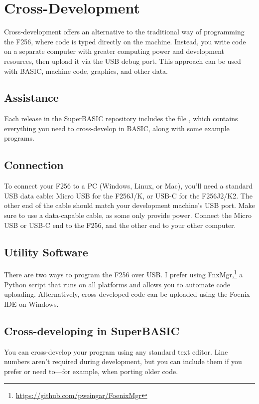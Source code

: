 \chapter{Cross-Development}
\label{chap:crossdev}

Cross-development offers an alternative to the traditional way of programming the F256, where code is typed directly on the machine. Instead, you write code on a separate computer with greater computing power and development resources, then upload it via the USB debug port. This approach can be used with BASIC, machine code, graphics, and other data.

\section{Assistance}

Each release in the SuperBASIC repository includes the file , which contains everything you need to cross-develop in BASIC, along with some example programs.

\section{Connection}

To connect your F256 to a PC (Windows, Linux, or Mac), you'll need a standard USB data cable: Micro USB for the F256J/K, or USB-C for the F256J2/K2. The other end of the cable should match your development machine's USB port. Make sure to use a data-capable cable, as some only provide power. Connect the Micro USB or USB-C end to the F256, and the other end to your other computer.

\section{Utility Software}

There are two ways to program the F256 over USB. I prefer using FnxMgr,\footnote{\url{https://github.com/pweingar/FoenixMgr}} a Python script that runs on all platforms and allows you to automate code uploading. Alternatively, cross-developed code can be uploaded using the Foenix IDE on Windows.

\section{Cross-developing in SuperBASIC}

You can cross-develop your program using any standard text editor. Line numbers aren’t required during development, but you can include them if you prefer or need to---for example, when porting older code.

